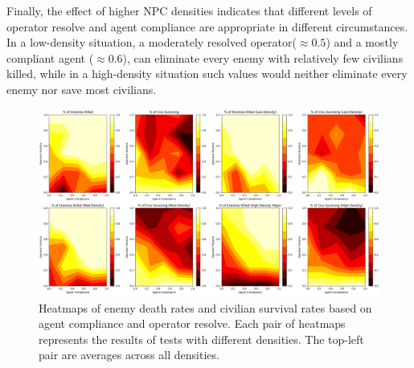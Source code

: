 \documentclass[letterpaper,11pt]{article}
\begin{document}
	Finally, the effect of higher NPC densities indicates that different levels of operator resolve and agent compliance are appropriate in different circumstances. In a low-density situation, a moderately resolved operator($ \approx 0.5 $) and a mostly compliant agent ($ \approx 0.6 $), can eliminate every enemy with relatively few civilians killed, while in a high-density situation such values would neither eliminate every enemy nor save most civilians. \par
	
	\begin{figure}[p]
		\centering
		\includegraphics[width=\linewidth]{figures/Heatmaps}
		\caption{Heatmaps of enemy death rates and civilian survival rates based on agent compliance and operator resolve. Each pair of heatmaps represents the results of tests with different densities. The top-left pair are averages across all densities.}
		\label{fig:Heatmaps}
	\end{figure}
\end{document}
